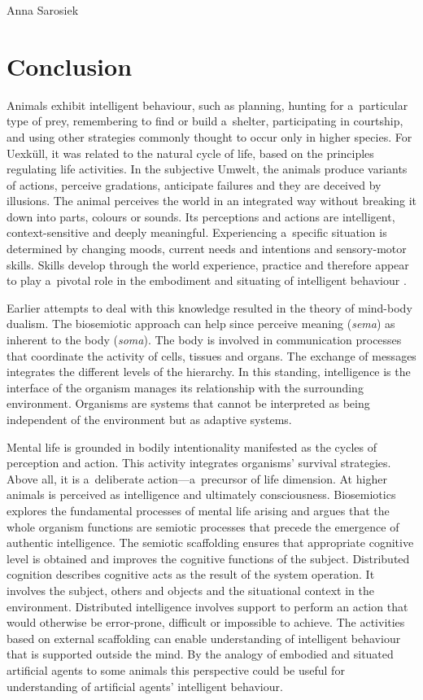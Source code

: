 \begin{artengenv}{Anna Sarosiek}
\section*{Conclusion}
Animals exhibit intelligent behaviour, such as planning, hunting for a~particular type of prey, remembering to find or build a~shelter, participating in courtship, and using other strategies commonly thought to occur only in higher species. For Uexküll, it was related to the natural cycle of life, based on the principles regulating life activities. In the subjective Umwelt, the animals produce variants of actions, perceive gradations, anticipate failures and they are deceived by illusions. The animal perceives the world in an integrated way without breaking it down into parts, colours or sounds. Its perceptions and actions are intelligent, context-sensitive and deeply meaningful. Experiencing a~specific situation is determined by changing moods, current needs and intentions and sensory-motor skills. Skills develop through the world experience, practice and therefore appear to play a~pivotal role in the embodiment and situating of intelligent behaviour
\parencites[][]{dreyfus_what_1979}[][]{searle_rediscovery_1992}.%


Earlier attempts to deal with this knowledge resulted in the theory of mind-body dualism. The biosemiotic approach can help since perceive meaning (\textit{sema}) as inherent to the body (\textit{soma}). The body is involved in communication processes that coordinate the activity of cells, tissues and organs. The exchange of messages integrates the different levels of the hierarchy. In this standing, intelligence is the interface of the organism manages its relationship with the surrounding environment. Organisms are systems that cannot be interpreted as being independent of the environment but as adaptive systems.

Mental life is grounded in bodily intentionality manifested as the cycles of perception and action. This activity integrates organisms’ survival strategies. Above all, it is a~deliberate action---a~precursor of life dimension. At higher animals is perceived as intelligence and ultimately consciousness. Biosemiotics explores the fundamental processes of mental life arising and argues that the whole organism functions are semiotic processes that precede the emergence of authentic intelligence. The semiotic scaffolding ensures that appropriate cognitive level is obtained and improves the cognitive functions of the subject. Distributed cognition describes cognitive acts as the result of the system operation. It involves the subject, others and objects and the situational context in the environment. Distributed intelligence involves support to perform an action that would otherwise be error-prone, difficult or impossible to achieve. The activities based on external scaffolding can enable understanding of intelligent behaviour that is supported outside the mind. By the analogy of embodied and situated artificial agents to some animals this perspective could be useful for understanding of artificial agents’ intelligent behaviour.

\end{artengenv}